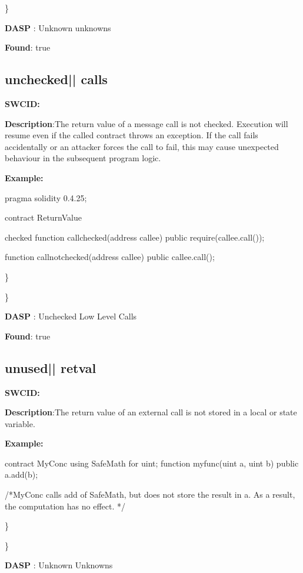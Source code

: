 \documentclass{article}
\begin{document}
\} 

\textbf{DASP} : Unknown unknowns

\textbf{Found}: true

\subsection{unchecked{|\textunderscore| }calls} 
\textbf{SWC{\textunderscore }ID:} 

\textbf{Description}:The return value of a message call is not checked. Execution will resume even if the called contract throws an exception. If the call fails accidentally or an attacker forces the call to fail, this may cause unexpected behaviour in the subsequent program logic.


\textbf{Example:} 
\begin{ffcode} 

pragma solidity 0.4.25;

contract ReturnValue {

checked
function callchecked(address callee) public {
    require(callee.call());
  }

  function callnotchecked(address callee) public {
    callee.call();
  }
}

\end{ffcode} 
\} 

\} 

\textbf{DASP} : Unchecked Low Level Calls

\textbf{Found}: true

\subsection{unused{|\textunderscore| }retval} 
\textbf{SWC{\textunderscore }ID:} 

\textbf{Description}:The return value of an external call is not stored in a local or state variable.


\textbf{Example:} 
\begin{ffcode} 

contract MyConc{
    using SafeMath for uint;
    function my\textunderscore func(uint a, uint b) public{
        a.add(b);
    }
}

 /*MyConc calls add of SafeMath, but does not store the result in a. As a result, the computation has no effect. */ 

\end{ffcode} 
\} 

\} 

\textbf{DASP} : Unknown Unknowns
\end{document}

